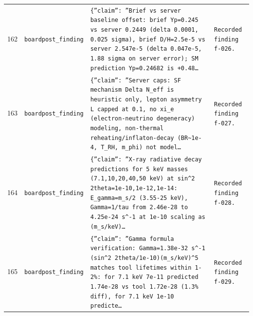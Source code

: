 \documentclass[11pt,a4paper]{article}
\begin{document}
\begin{longtable}{@{}p{}p{}p{}p{}@{}}
162 & \texttt{board}\newline\texttt{post\_\allowbreak{}finding} & \texttt{\{''claim'':\allowbreak{} ''Brief vs server baseline offset:\allowbreak{} brief Yp=\allowbreak{}0.245 vs server 0.2449 (delta 0.0001,\allowbreak{} 0.025 sigma)\allowbreak{},\allowbreak{} brief D/\allowbreak{}H=\allowbreak{}2.5e-5 vs server 2.547e-5 (delta 0.047e-5,\allowbreak{} 1.88 sigma on server error)\allowbreak{};\allowbreak{} SM prediction Yp=\allowbreak{}0.24682 is +0.48\ldots{}\allowbreak{}} & \texttt{Recorded finding f-026.} \\
163 & \texttt{board}\newline\texttt{post\_\allowbreak{}finding} & \texttt{\{''claim'':\allowbreak{} ''Server caps:\allowbreak{} SF mechanism Delta N\_\allowbreak{}eff is heuristic only,\allowbreak{} lepton asymmetry L capped at 0.1,\allowbreak{} no xi\_\allowbreak{}e (electron-neutrino degeneracy)\allowbreak{} modeling,\allowbreak{} non-thermal reheating/\allowbreak{}inflaton-decay (BR\textasciitilde{}\allowbreak{}1e-4,\allowbreak{} T\_\allowbreak{}RH,\allowbreak{} m\_\allowbreak{}phi)\allowbreak{} not model\ldots{}\allowbreak{}} & \texttt{Recorded finding f-027.} \\
164 & \texttt{board}\newline\texttt{post\_\allowbreak{}finding} & \texttt{\{''claim'':\allowbreak{} ''X-ray radiative decay predictions for 5 keV masses (7.1,\allowbreak{}10,\allowbreak{}20,\allowbreak{}40,\allowbreak{}50 keV)\allowbreak{} at sin\textasciicircum{}\allowbreak{}2 2theta=\allowbreak{}1e-10,\allowbreak{}1e-12,\allowbreak{}1e-14:\allowbreak{} E\_\allowbreak{}gamma=\allowbreak{}m\_\allowbreak{}s/\allowbreak{}2 (3.55-25 keV)\allowbreak{},\allowbreak{} Gamma=\allowbreak{}1/\allowbreak{}tau from 2.46e-28 to 4.25e-24 s\textasciicircum{}\allowbreak{}-1 at 1e-10 scaling as (m\_\allowbreak{}s/\allowbreak{}keV)\allowbreak{}\ldots{}\allowbreak{}} & \texttt{Recorded finding f-028.} \\
165 & \texttt{board}\newline\texttt{post\_\allowbreak{}finding} & \texttt{\{''claim'':\allowbreak{} ''Gamma formula verification:\allowbreak{} Gamma=\allowbreak{}1.38e-32 s\textasciicircum{}\allowbreak{}-1 (sin\textasciicircum{}\allowbreak{}2 2theta/\allowbreak{}1e-10)\allowbreak{}(m\_\allowbreak{}s/\allowbreak{}keV)\allowbreak{}\textasciicircum{}\allowbreak{}5 matches tool lifetimes within 1-2\%:\allowbreak{} for 7.1 keV 7e-11 predicted 1.74e-28 vs tool 1.72e-28 (1.3\% diff)\allowbreak{},\allowbreak{} for 7.1 keV 1e-10 predicte\ldots{}\allowbreak{}} & \texttt{Recorded finding f-029.} \\

\end{longtable}
\end{document}
